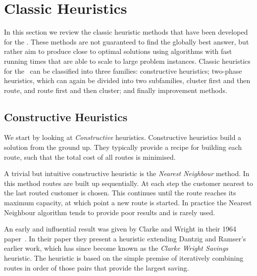 \section{Classic Heuristics}
\label{sec:ch}

In this section we review the classic heuristic methods that have been developed for the \VRP. These methods are not guaranteed to find the globally best answer, but rather aim to produce close to optimal solutions using algorithms with fast running times that are able to scale to large problem instances. Classic heuristics for the \VRP\ can be classified into three families: constructive heuristics; two-phase heuristics, which can again be divided into two subfamilies, cluster first and then route, and route first and then cluster; and finally improvement methods.

\subsection{Constructive Heuristics}
\label{subsec:conheu}

We start by looking at \emph{Constructive} heuristics. Constructive heuristics build a solution from the ground up. They typically provide a recipe for building each route, such that the total cost of all routes is minimised.

A trivial but intuitive constructive heuristic is the \emph{Nearest Neighbour} method. In this method routes are built up sequentially. At each step the customer nearest to the last routed customer is chosen. This continues until the route reaches its maximum capacity, at which point a new route is started. In practice the Nearest Neighbour algorithm tends to provide poor results and is rarely used. 
 

An early and influential result was given by Clarke and Wright in their 1964 paper~\cite{clark:1964}. In their paper they present a heuristic extending Dantzig and Ramser's earlier work, which has since become known as the \emph{Clarke Wright Savings} heuristic. The heuristic is based on the simple premise of iteratively combining routes in order of those pairs that provide the largest saving. 


